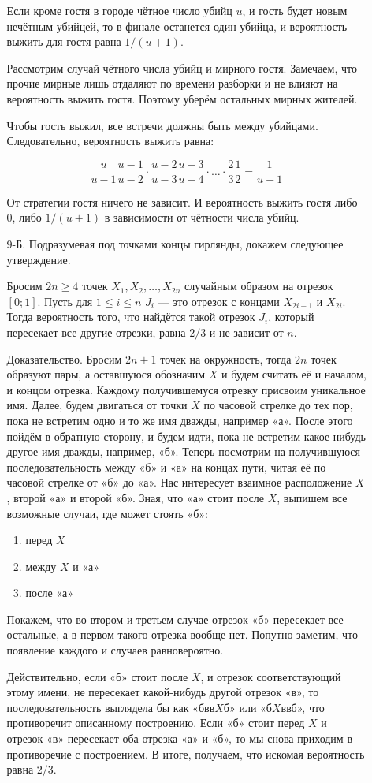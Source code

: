 \begin{enumerate}
\begin{enumerate}
Если кроме гостя в городе чётное число убийц $u$, и гость будет новым нечётным убийцей,
то в финале останется один убийца, и вероятность выжить для гостя равна $1/(u+1)$.

Рассмотрим случай чётного числа убийц и мирного гостя. Замечаем, что прочие мирные
лишь отдаляют по времени разборки и не влияют на вероятность выжить гостя.
Поэтому уберём остальных мирных жителей.

Чтобы гость выжил, все встречи должны быть между убийцами. Следовательно, вероятность
выжить равна:

\[
\frac{u}{u-1}\frac{u-1}{u-2} \cdot \frac{u-2}{u-3}\frac{u-3}{u-4}\cdot \ldots
\cdot \frac{2}{3}\frac{1}{2} = \frac{1}{u+1}
\]

От стратегии гостя ничего не зависит.
И вероятность выжить гостя либо 0, либо $1/(u+1)$ в зависимости от чётности числа убийц.

\item[9-Б.]
Подразумевая под точками концы гирлянды, докажем следующее утверждение.

Бросим $2n \geq 4$ точек $X_1, X_2, \ldots, X_{2n}$ случайным образом на отрезок
$[0;1]$. Пусть для $1 \leq i \leq n$ $J_i$ — это отрезок с концами $X_{2i-1}$ и $X_{2i}$.
Тогда вероятность того, что найдётся такой отрезок $J_i$, который пересекает все
другие отрезки, равна $2/3$ и не зависит от $n$.

Доказательство. Бросим $2n+1$ точек на окружность, тогда $2n$ точек образуют пары,
а оставшуюся обозначим $X$ и будем считать её и началом, и концом отрезка. Каждому
получившемуся отрезку присвоим уникальное имя. Далее, будем двигаться от точки $X$
по часовой стрелке до тех пор, пока не встретим одно и то же имя дважды, например «а».
После этого пойдём в обратную сторону, и будем идти, пока не встретим какое-нибудь
другое имя дважды, например, «б». Теперь посмотрим на получившуюся последовательность
между «б» и «а» на концах пути, читая её по часовой стрелке от «б» до «а». Нас
интересует взаимное расположение $X$, второй «а» и второй «б». Зная, что «а» стоит
после $X$, выпишем все возможные случаи, где может стоять «б»:
\begin{enumerate}
\item перед $X$
\item между $X$ и «а»
\item после «а»
\end{enumerate}
Покажем, что во втором и третьем случае отрезок «б» пересекает все остальные, а в
первом такого отрезка вообще нет. Попутно заметим, что появление каждого и случаев
равновероятно.

Действительно, если «б» стоит после $X$, и отрезок соответствующий этому имени,
не пересекает какой-нибудь другой отрезок «в», то последовательность выглядела бы
как «бвв$X$б» или «б$X$ввб», что противоречит описанному построению.
Если «б» стоит перед $X$ и отрезок «в» пересекает оба отрезка «а» и «б», то мы
снова приходим в противоречие с построением. В итоге, получаем, что искомая вероятность
равна $2/3$.
\end{enumerate}
\end{enumerate}



